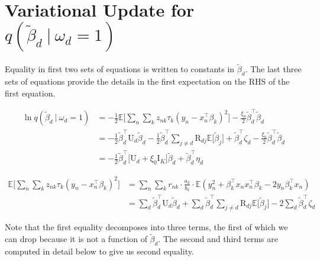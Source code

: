 \documentclass[twoside,11pt]{article}
\newcommand\given[1][]{\:#1\vert\:}
\newcommand{\transpose}[1]{#1^{\intercal}}
\newcommand{\nsum}{\sum\limits_{n}}
\newcommand{\ksum}{\sum\limits_{k}}
\newcommand{\E}{\mathbb{E}}
\newcommand{\betad}{\tilde{\beta}_d}
\newcommand{\umat}{\mathrm{U}}
\begin{document}
\newpage


\section{Variational Update for $q(\betad \given \omega_d = 1)$}

Equality in first two sets of equations is written to constants in $\betad$. The last three sets of equations provide the details in the first expectation on the RHS of the first equation. 

\begin{align*}
	 \ln q\left(\betad \given \omega_d = 1 \right) &= - \frac{1}{2}\E \Big[ \nsum \ksum z_{nk} \tau_k \left( y_n - \transpose{x_n} \beta_k \right)^2\Big] - \frac{\xi_0}{2} \transpose{\betad} \betad \\
	 &= - \frac{1}{2} \transpose{\betad} \mathrm{U}_d \betad - \frac{1}{2} \transpose{\betad} \sum_{j \neq d} \mathrm{R}_{dj} \E \big[ \tilde{\beta}_j \big] + \transpose{\betad} \zeta_d - \frac{\xi_0}{2}  \transpose{\betad} \betad \\
	 &= - \frac{1}{2} \transpose{\betad} \big[ \umat_d +  \xi_0 \mathrm{I}_K\big] \betad + \transpose{\betad} \eta_d 
\end{align*}


\begin{align*}
	\E \Big[ \nsum \ksum z_{nk} \tau_k \left( y_n - \transpose{x_n} \beta_k \right)^2 \Big]  &= \nsum \ksum r_{nk} \cdot \frac{a_k}{b_k} \cdot \E \left( y_n^2 + \transpose{\beta_k} x_n \transpose{x_n} \beta_k - 2y_n \transpose{\beta_k}x_n \right) \\
	&=  \sum_d \transpose{\betad} \mathrm{U}_d \betad + \sum_d \transpose{\betad} \sum_{j \neq d} \mathrm{R}_{dj} \E \big[ \tilde{\beta}_j \big] - 2 \sum_d \transpose{\betad} \zeta_d
\end{align*}

Note that the first equality decomposes into three terms, the first of which we can drop because it is not a function of $\betad$. The second and third terms are computed in detail below to give us second equality. 
\end{document}
